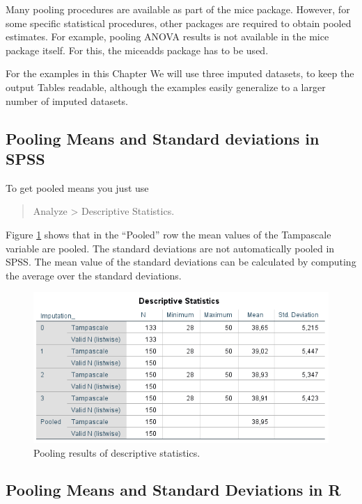 \documentclass[]{book}
\theoremstyle{definition}
\theoremstyle{definition}
\theoremstyle{definition}
\theoremstyle{remark}
\begin{document}
Many pooling procedures are available as part of the mice package.
However, for some specific statistical procedures, other packages are
required to obtain pooled estimates. For example, pooling ANOVA results
is not available in the mice package itself. For this, the miceadds
package has to be used.

For the examples in this Chapter We will use three imputed datasets, to
keep the output Tables readable, although the examples easily generalize
to a larger number of imputed datasets.

\subsection{Pooling Means and Standard deviations in
SPSS}\label{pooling-means-and-standard-deviations-in-spss}

To get pooled means you just use

\begin{quote}
Analyze \textgreater{} Descriptive Statistics.
\end{quote}

Figure \ref{fig:tab5-3} shows that in the ``Pooled'' row the mean values
of the Tampascale variable are pooled. The standard deviations are not
automatically pooled in SPSS. The mean value of the standard deviations
can be calculated by computing the average over the standard deviations.

\begin{figure}

{\centering \includegraphics[width=0.9\linewidth]{images/table5.3} 

}

\caption{Pooling results of descriptive statistics.}\label{fig:tab5-3}
\end{figure}

\subsection{Pooling Means and Standard Deviations in
R}\label{pooling-means-and-standard-deviations-in-r}
\end{document}
